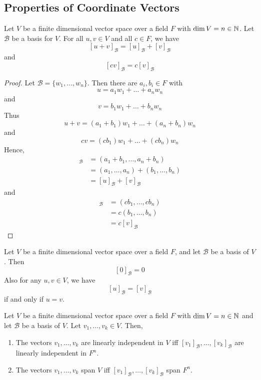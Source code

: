 \documentclass{article}
\begin{document}
\subsection{Properties of Coordinate Vectors}
\begin{theorem}
  Let $V$ be a finite dimensional vector space over a field $F$ with $\dim V = n \in \mathbb{N}$. Let $\mathcal{B}$ be a basis for $V$. For all $u, v \in V$ and all $c \in F$, we have
  \[
    [u+v]_\mathcal{B} = [u]_\mathcal{B} + [v]_\mathcal{B}
  \]
  and \[
    [cv]_\mathcal{B} = c[v]_\mathcal{B}
  \]
\end{theorem}
\begin{proof}
  Let $\mathcal{B} = \{w_1, \ldots, w_n\}$. Then there are $a_i, b_i \in F$ with \[
    u = a_1w_1 + \dots + a_nw_n
  \] and \[
    v = b_1w_1 + \dots + b_nw_n
  \]
  Thus
  \[
    u+v = (a_1 + b_1)w_1 + \dots + (a_n + b_n)w_n
  \]
  and \[
    cv = (cb_1)w_1 + \dots + (cb_n)w_n
  \]
  Hence,
  \begin{align*}
    [u+v]_\mathcal{B} &= (a_1 + b_1, \ldots, a_n+b_n)\\
    &= (a_1, \ldots, a_n) + (b_1, \ldots, b_n)\\
    &= [u]_\mathcal{B} + [v]_\mathcal{B}
  \end{align*}
  and
  \begin{align*}
    [cv]_\mathcal{B} &= (cb_1, \ldots, cb_n)\\
    &= c(b_1, \ldots, b_n)\\
    &= c[v]_\mathcal{B}
  \end{align*}
\end{proof}
\begin{theorem}
  Let $V$ be a finite dimensional vector space over a field $F$, and let $\mathcal{B}$ be a basis of $V$. Then
  \[
    [0]_\mathcal{B} = 0
  \]
  Also for any $u, v \in V$, we have
  \[
    [u]_\mathcal{B} = [v]_\mathcal{B}
  \]
  if and only if $u = v$.
\end{theorem}
\begin{theorem}
  Let $V$ be a finite dimensional vector space over a field $F$ with $\dim V = n \in \mathbb{N}$ and let $\mathcal{B}$ be a basis of $V$. Let $v_1, \ldots, v_k \in V$. Then,
  \begin{enumerate}
    \item The vectors $v_1, \ldots, v_k$ are linearly independent in $V$ iff $[v_1]_\mathcal{B}, \ldots, [v_k]_\mathcal{B}$ are linearly independent in $F^n$.
    \item The vectors $v_1, \ldots, v_k$ span $V$ iff $[v_1]_\mathcal{B}, \ldots, [v_k]_\mathcal{B}$ span $F^n$.
  \end{enumerate}
\end{theorem}
\end{document}
